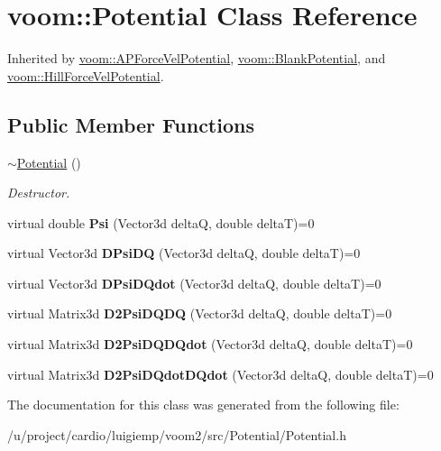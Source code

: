 \hypertarget{classvoom_1_1_potential}{
\section{voom::Potential Class Reference}
\label{classvoom_1_1_potential}
}


Inherited by \hyperlink{classvoom_1_1_a_p_force_vel_potential}{voom::APForceVelPotential}, \hyperlink{classvoom_1_1_blank_potential}{voom::BlankPotential}, and \hyperlink{classvoom_1_1_hill_force_vel_potential}{voom::HillForceVelPotential}.\subsection*{Public Member Functions}
\begin{DoxyCompactItemize}
\item 
\hypertarget{classvoom_1_1_potential_a1c820892790fc87023676111a1e6abe0}{
\hyperlink{classvoom_1_1_potential_a1c820892790fc87023676111a1e6abe0}{$\sim$Potential} ()}
\label{classvoom_1_1_potential_a1c820892790fc87023676111a1e6abe0}

\begin{DoxyCompactList}\small\item\em Destructor. \item\end{DoxyCompactList}\item 
\hypertarget{classvoom_1_1_potential_ac437b1b4d2ad0350997a1dbea4fcdeac}{
virtual double {\bfseries Psi} (Vector3d deltaQ, double deltaT)=0}
\label{classvoom_1_1_potential_ac437b1b4d2ad0350997a1dbea4fcdeac}

\item 
\hypertarget{classvoom_1_1_potential_abad2ee6466bc79cbe946fa5955e340c3}{
virtual Vector3d {\bfseries DPsiDQ} (Vector3d deltaQ, double deltaT)=0}
\label{classvoom_1_1_potential_abad2ee6466bc79cbe946fa5955e340c3}

\item 
\hypertarget{classvoom_1_1_potential_ac6ad31074134b9b69f6572d27d007393}{
virtual Vector3d {\bfseries DPsiDQdot} (Vector3d deltaQ, double deltaT)=0}
\label{classvoom_1_1_potential_ac6ad31074134b9b69f6572d27d007393}

\item 
\hypertarget{classvoom_1_1_potential_a6d2db4b0825333ff712edca4f6048069}{
virtual Matrix3d {\bfseries D2PsiDQDQ} (Vector3d deltaQ, double deltaT)=0}
\label{classvoom_1_1_potential_a6d2db4b0825333ff712edca4f6048069}

\item 
\hypertarget{classvoom_1_1_potential_a3b8563ea863a70a9dcbd00f78c9932ca}{
virtual Matrix3d {\bfseries D2PsiDQDQdot} (Vector3d deltaQ, double deltaT)=0}
\label{classvoom_1_1_potential_a3b8563ea863a70a9dcbd00f78c9932ca}

\item 
\hypertarget{classvoom_1_1_potential_a310d44589e6ceea0d01fbe60199a4c6e}{
virtual Matrix3d {\bfseries D2PsiDQdotDQdot} (Vector3d deltaQ, double deltaT)=0}
\label{classvoom_1_1_potential_a310d44589e6ceea0d01fbe60199a4c6e}

\end{DoxyCompactItemize}


The documentation for this class was generated from the following file:\begin{DoxyCompactItemize}
\item 
/u/project/cardio/luigiemp/voom2/src/Potential/Potential.h\end{DoxyCompactItemize}
